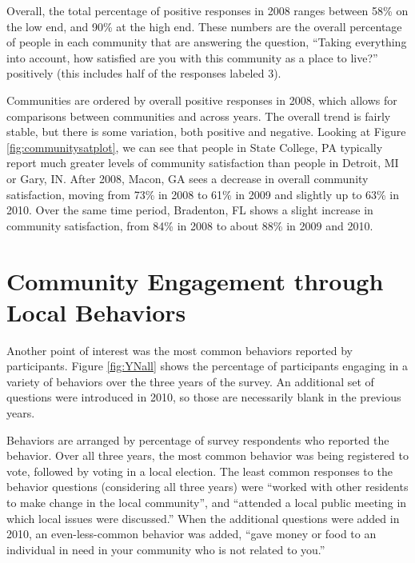 \documentclass[smallextended]{svjour3}\usepackage[]{graphicx}\usepackage[]{color}
\begin{document}
Overall, the total percentage of positive responses in 2008 ranges between 58\% on the low end, and 90\% at the high end. These numbers are the overall percentage of people in each community that are answering the question, ``Taking everything into account, how satisfied are you with this community as a place to live?'' positively (this includes half of the responses labeled 3).

Communities are ordered by overall positive responses in 2008, which allows for comparisons between communities and across years. The overall trend is fairly stable, but there is some variation, both positive and negative. Looking at Figure \ref{fig:communitysatplot}, we can see that people in State College, PA typically report much greater levels of community satisfaction than people in Detroit, MI or Gary, IN. After 2008, Macon, GA sees a decrease in overall community satisfaction, moving from 73\% in 2008 to 61\% in 2009 and slightly up to 63\% in 2010. Over the same time period, Bradenton, FL shows a slight increase in community satisfaction, from 84\% in 2008 to about  88\% in 2009 and 2010. 

\section{Community Engagement through Local Behaviors}
\label{behaviorsec}
Another point of interest was the most common behaviors reported by participants. Figure \ref{fig:YNall} shows the percentage of participants engaging in a variety of behaviors over the three years of the survey. An additional set of questions were introduced in 2010, so those are necessarily blank in the previous years. 

Behaviors are arranged by percentage of survey respondents who reported the behavior. 
Over all three years, the most common behavior was being registered to vote, followed by voting in a local election. The least common responses to the behavior questions (considering all three years) were ``worked with other residents to make change in the local community'', and ``attended a local public meeting in which local issues were discussed.'' When the additional questions were added in 2010, an even-less-common behavior was added, ``gave money or food to an individual in need in your community who is not related to you.'' 
\end{document}
